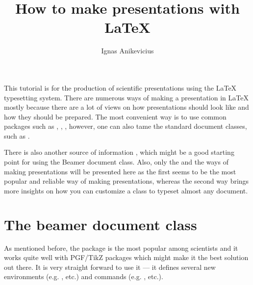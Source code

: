 \documentclass[
]{scrartcl}
\title{How to make presentations with \LaTeX{}}
\author{Ignas Anikevicius}
\begin{document}
\maketitle
\tableofcontents
\listoftodos{\vskip 1em}

%
This tutorial is for the production of scientific presentations using the
    \LaTeX{} typesetting system.
%
There are numerous ways of making a presentation in \LaTeX{} mostly because
    there are a lot of views on how presentations should look like and how they
    should be prepared.
%
The most convenient way is to use common packages such as ,
    , , however, one can also tame the standard
    document classes, such as  \cite{PracTeX-komapres}.

%
There is also another source of information \cite{latexwikibook:presentations},
    which might be a good starting point for using the Beamer document class.
%
Also, only the  and the  ways of making presentations
    will be presented here as the first seems to be the most popular and
    reliable way of making presentations, whereas the second way brings more
    insights on how you can customize a class to typeset almost any document.

\section{The beamer document class}

%
As mentioned before, the  package is the most popular among
    scientists and it works quite well with PGF/TikZ packages which might make
    it the best solution out there.
%
It is very straight forward to use it --- it defines several new environments
    (e.g. ,  etc.) and commands (e.g. ,
     etc.).

%
\end{document}

